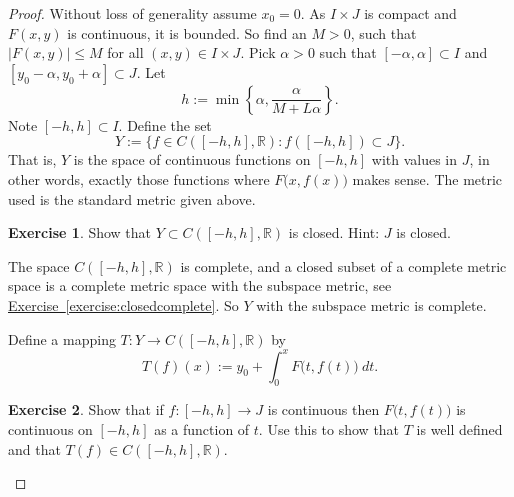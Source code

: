 \documentclass[12pt]{book}
\newcommand{\abs}[1]{\left\lvert {#1} \right\rvert}
\newcommand{\R}{{\mathbb{R}}}
\theoremstyle{plain}
\theoremstyle{remark}
\theoremstyle{definition}
\theoremstyle{exercise}
\newtheorem{exercise}{Exercise}[section]
\theoremstyle{example}
\newcommand{\exerciseref}[1]{\hyperref[#1]{Exercise~\ref*{#1}}}
\begin{document}
\begin{proof}
Without loss of generality assume $x_0 =0$.
As $I \times J$ is compact and
$F(x,y)$ is continuous, it is bounded.
So find an $M > 0$, such that
$\abs{F(x,y)} \leq M$ for all $(x,y) \in I\times J$.
Pick $\alpha > 0$ such that
$[-\alpha,\alpha] \subset I$ and $[y_0-\alpha, y_0 + \alpha] \subset J$.
Let
\begin{equation*}
h := \min \left\{ \alpha, \frac{\alpha}{M+L\alpha} \right\} .
\end{equation*}
Note $[-h,h] \subset I$.  Define the set
\begin{equation*}
Y := \{ f \in C([-h,h],\R) : f([-h,h]) \subset J \} . %
\end{equation*}
That is, $Y$ is the space of continuous functions on $[-h,h]$ with values in
$J$, in other words,
exactly those functions where $F\bigl(x,f(x)\bigr)$ makes sense.
The metric used is the standard metric given above.

\begin{exercise}
Show that $Y \subset C([-h,h],\R)$ is closed.  Hint: $J$ is closed.
\end{exercise}

The space $C([-h,h],\R)$ is complete, and
a closed subset of a complete metric space is a complete metric space with
the subspace metric, see \exerciseref{exercise:closedcomplete}.  So $Y$ with the subspace metric is
complete.

Define a mapping
$T \colon Y \to C([-h,h],\R)$ by
\begin{equation*}
T(f)(x)
:=
y_0 + \int_0^x F\bigl(t,f(t)\bigr)~dt .
\end{equation*}

\begin{exercise}
Show that if $f \colon [-h,h] \to J$ is continuous then $F\bigl(t,f(t)\bigr)$
is continuous on $[-h,h]$ as a function of $t$.  Use this to show that
$T$ is well defined and that $T(f) \in C([-h,h],\R)$.
\end{exercise}


\end{proof}
\end{document}
